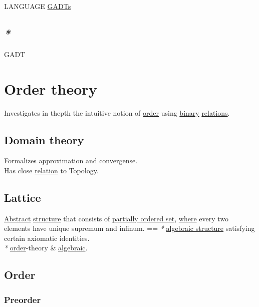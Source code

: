 \documentclass[a4paper,14pt,oneside]{book}
\begin{document}
LANGUAGE \hyperref[orgc7fa4ac]{GADTs}\\

\section{\emph{*}}
\label{sec:orgc23a0f8}

\label{orgb4ee4a8}GADT\\

\chapter{\label{orgbf32312}Order theory}
\label{sec:orgf172a7c}

Investigates in thepth the intuitive notion of \hyperref[org31793bd]{order} using \hyperref[orgd0575cd]{binary} \hyperref[org7f47507]{relations}.\\

\section{\label{orgeea66c6}Domain theory}
\label{sec:orgc633b87}

Formalizes approximation and convergense.\\
Has close \hyperref[org70d7aba]{relation} to Topology.\\

\section{\label{org2b6d6f4}Lattice}
\label{sec:orgcf6c706}

\hyperref[org321fc4b]{Abstract} \hyperref[orgc940043]{structure} that consists of \hyperref[org43f8e76]{partially ordered set}, \hyperref[orgd3dc8e4]{where} every two elements have unique supremum and infinum. == \emph{*} \hyperref[org3279da7]{algebraic structure} satisfying certain axiomatic identities.\\
\emph{*} \hyperref[org31793bd]{order}-theory \& \hyperref[orga42386a]{algebraic}.\\

\section{\label{org31793bd}Order}
\label{sec:orgde7ba4f}

\subsection{\label{org95faaae}Preorder}
\label{sec:orgd9abafc}
\end{document}
